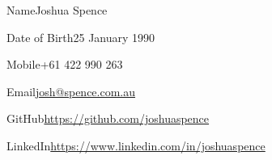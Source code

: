 \begin{personalDetails}
  \item{Name}{Joshua Spence}
  \item{Date of Birth}{25 January 1990}
  \item{Mobile}{+61 422 990 263\vspace{1em}}
  \item{Email}{\url{josh@spence.com.au}}
  \item{GitHub}{\url{https://github.com/joshuaspence}}
  \item{LinkedIn}{\url{https://www.linkedin.com/in/joshuaspence}}
\end{personalDetails}
